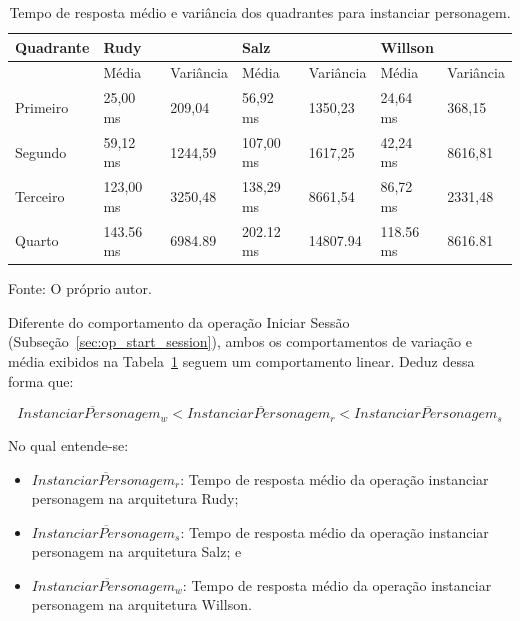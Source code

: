 \begin{table}[htb!]
\centering
\begin{adjustbox}{max width=\textwidth}
\caption{Tempo de resposta médio e variância dos quadrantes para instanciar personagem.}
\label{tab:op_spawn_character}
\begin{tabular}{l||l|l||l|l||l|l}

\hline \hline

Quadrante & \multicolumn{2}{l||}{Rudy}    & \multicolumn{2}{l||}{Salz}    & \multicolumn{2}{l}{Willson} \\ \hline \hline

& Média & Variância & Média & Variância & Média & Variância \\ \hline

Primeiro  & 25,00 ms & 209,04 & 56,92 ms & 1350,23 & 24,64 ms & 368,15 \\ \hline

Segundo  & 59,12 ms & 1244,59 & 107,00 ms & 1617,25 & 42,24 ms & 8616,81 \\ \hline

Terceiro  & 123,00 ms & 3250,48 & 138,29 ms & 8661,54 & 86,72 ms & 2331,48 \\ \hline

Quarto  & 143.56 ms & 6984.89 & 202.12 ms & 14807.94 & 118.56 ms & 8616.81 \\ \hline \hline

\end{tabular}

\end{adjustbox}

Fonte: O próprio autor.
\end{table}

Diferente do comportamento da operação Iniciar Sessão (Subseção~\ref{sec:op_start_session}), ambos os comportamentos de variação e média exibidos na Tabela~\ref{tab:op_spawn_character} seguem um comportamento linear.
%
Deduz dessa forma que:

$$
  \overline{InstanciarPersonagem_{w}} < \overline{InstanciarPersonagem_{r}} <\overline{InstanciarPersonagem_{s}}
$$

No qual entende-se:

\begin{itemize}
 \item $\overline{InstanciarPersonagem_{r}}$: Tempo de resposta médio da operação instanciar personagem na arquitetura Rudy;
 \item $\overline{InstanciarPersonagem_{s}}$: Tempo de resposta médio da operação instanciar personagem na arquitetura Salz; e
 \item $\overline{InstanciarPersonagem_{w}}$: Tempo de resposta médio da operação instanciar personagem na arquitetura Willson.
\end{itemize}


